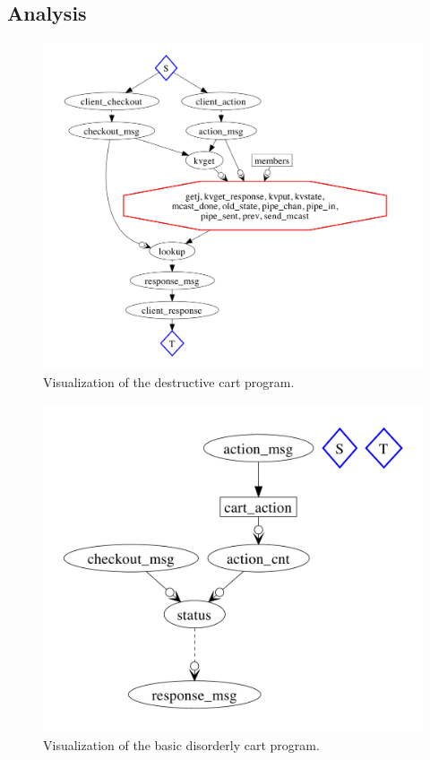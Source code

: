 \subsection{Analysis}

\begin{figure}[t]
\centering
\includegraphics[width=1.1\linewidth]{fig/destructive_kvs.pdf}
\vspace{-10pt}
\caption{Visualization of the destructive cart program.}
\label{fig:pdg-destructive-kvs-analysis}
\vspace{-2pt}
\end{figure}

\begin{figure}[t]
\centering
\includegraphics[width=0.8\linewidth]{fig/disorderly_base.pdf}
\vspace{-10pt}
\caption{Visualization of the basic disorderly cart program.}
\label{fig:pdg-disorderly-base}
\vspace{-2pt}
\end{figure}

